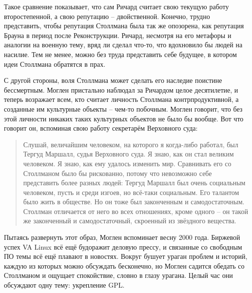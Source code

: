 Такое сравнение показывает, что сам Ричард считает свою текущую работу второстепенной, а свою репутацию -- двойственной. Конечно, трудно представить, чтобы репутация Столлмана была так же опозорена, как репутация Брауна в период после Реконструкции. Ричард, несмотря на его метафоры и аналогии на военную тему, вряд ли сделал что-то, что вдохновило бы людей на насилие. Тем не менее, можно без труда представить себе будущее, в котором идеи Столлмана обратятся в прах. 

С другой стороны, воля Столлмана может сделать его наследие поистине бессмертным. Моглен пристально наблюдал за Ричардом целое десятилетие, и теперь возражает всем, кто считает личность Столлмана контрпродуктивной, а созданные им культурные объекты -- чем-то побочным. Моглен говорит, что без этой личности никаких таких культурных объектов не было бы вообще. Вот что говорит он, вспоминая свою работу секретарём Верховного суда:

\begin{quote}
Слушай, величайшим человеком, на которого я когда-либо работал, был Тергуд Маршалл, судья Верховного суда. Я знаю, как он стал великим человеком. Я знаю, как ему удалось изменить мир. Сравнивать его со Столлманом было бы рискованно, потому что невозможно себе представить более разных людей: Тергуд Маршалл был очень социальным человеком, пусть и среди изгоев, но всё-таки социальным. Его талантом было жить в обществе. Но он тоже был законченным и самодостаточным. Столлман отличается от него во всех отношениях, кроме одного -- он такой же законченный и самодостаточный, скроенный из звёздного вещества.
\end{quote}

Пытаясь развернуть этот образ, Моглен вспоминает весну 2000 года. Биржевой успех VA Linux всё ещё будоражит деловую прессу, и связанные со свободным ПО темы всё ещё плавают в новостях. Вокруг бушует ураган проблем и историй, каждую из которых можно обсуждать бесконечно, но Моглен садится обедать со Столлманом и ощущает спокойствие, словно в глазу урагана. Целый час они обсуждают одну тему: укрепление GPL.

